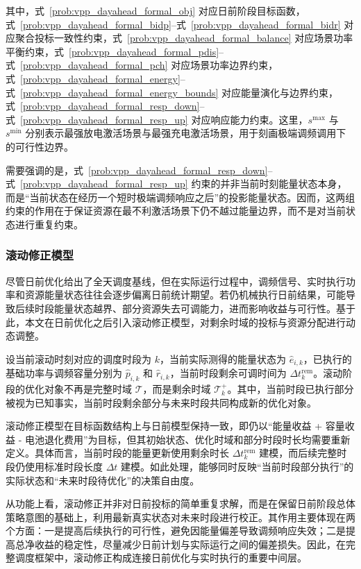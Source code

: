 其中，式~\eqref{prob:vpp_dayahead_formal_obj} 对应日前阶段目标函数，式~\eqref{prob:vpp_dayahead_formal_bidp}--式~\eqref{prob:vpp_dayahead_formal_bidr} 对应聚合投标一致性约束，式~\eqref{prob:vpp_dayahead_formal_balance} 对应场景功率平衡约束，式~\eqref{prob:vpp_dayahead_formal_pdis}--式~\eqref{prob:vpp_dayahead_formal_pch} 对应场景功率边界约束，式~\eqref{prob:vpp_dayahead_formal_energy}--式~\eqref{prob:vpp_dayahead_formal_energy_bounds} 对应能量演化与边界约束，式~\eqref{prob:vpp_dayahead_formal_resp_down}--式~\eqref{prob:vpp_dayahead_formal_resp_up} 对应响应能力约束。这里，$s^{\max}$ 与 $s^{\min}$ 分别表示最强放电激活场景与最强充电激活场景，用于刻画极端调频调用下的可行性边界。

需要强调的是，式~\eqref{prob:vpp_dayahead_formal_resp_down}--式~\eqref{prob:vpp_dayahead_formal_resp_up} 约束的并非当前时刻能量状态本身，而是“当前状态在经历一个短时极端调频响应之后”的投影能量状态。因而，这两组约束的作用在于保证资源在最不利激活场景下仍不越过能量边界，而不是对当前状态进行重复约束。

\subsubsection{滚动修正模型}
\label{subsubsec:vpp_admm_model_two_stage_rolling}

尽管日前优化给出了全天调度基线，但在实际运行过程中，调频信号、实时执行功率和资源能量状态往往会逐步偏离日前统计期望。若仍机械执行日前结果，可能导致后续时段能量状态越界、部分资源失去可调能力，进而影响收益与可行性。基于此，本文在日前优化之后引入滚动修正模型，对剩余时域的投标与资源分配进行动态调整。

设当前滚动时刻对应的调度时段为 $k$，当前实际测得的能量状态为 $\hat e_{i,k}$，已执行的基础功率与调频容量分别为 $\hat p_{i,k}$ 和 $\hat r_{i,k}$，当前时段剩余可调时间为 $\Delta t_k^{\mathrm{rem}}$。滚动阶段的优化对象不再是完整时域 $\mathcal{T}$，而是剩余时域 $\mathcal{T}_k^{+}$。其中，当前时段已执行部分被视为已知事实，当前时段剩余部分与未来时段共同构成新的优化对象。

滚动修正模型在目标函数结构上与日前模型保持一致，即仍以“能量收益 + 容量收益 - 电池退化费用”为目标，但其初始状态、优化时域和部分时段时长均需要重新定义。具体而言，当前时段的能量更新使用剩余时长 $\Delta t_k^{\mathrm{rem}}$ 建模，而后续完整时段仍使用标准时段长度 $\Delta t$ 建模。如此处理，能够同时反映“当前时段部分执行”的实际状态和“未来时段待优化”的决策自由度。

从功能上看，滚动修正并非对日前投标的简单重复求解，而是在保留日前阶段总体策略意图的基础上，利用最新真实状态对未来时段进行校正。其作用主要体现在两个方面：一是提高后续执行的可行性，避免因能量偏差导致调频响应失效；二是提高总净收益的稳定性，尽量减少日前计划与实际运行之间的偏差损失。因此，在完整调度框架中，滚动修正构成连接日前优化与实时执行的重要中间层。

